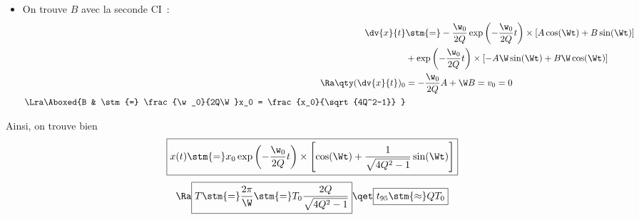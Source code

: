 \documentclass[a4paper, 10pt, final, garamond]{book}
\begin{document}
\begin{enumerate}[label=\sqenumi, leftmargin=10pt]
\begin{isd}[sidebyside align=top]
{\begin{itemize}
\begin{gather*}
					            x(0) = L_0 - \ell_0 =
					            1 \left[ A \cdot 1 + B \cdot 0 \right] = A
					            \quad \Ra \quad
					            \boxed{A \stm{=} x_0}
				            \end{gather*}
				      \item On trouve $B$ avec la seconde CI~:
				            \begin{align*}
					            \dv{x}{t}           & \stm{=}
					            -\frac{\w_0}{2Q}\exp \left( -\frac{\w_0}{2Q}t \right)
					            \times
					            \left[ A\cos(\Wt) + B\sin(\Wt) \right]
					            \\
					                                & +
					            \exp \left( -\frac{\w_0}{2Q}t \right)
					            \times
					            \left[ -A\W\sin(\Wt) + B\W\cos(\Wt) \right]
					            \\\Ra
					            \qty(\dv{x}{t})_{0} & =
					            - \frac{\w_0}{2Q}A + \W B = v_0 = 0
					            \\\Lra
					            \Aboxed{%
					            B                   & \stm{=}
						            \frac{\w_0}{2Q\W}x_0 = \frac{x_0}{\sqrt{4Q^2-1}}
					            }
				            \end{align*}
			      \end{itemize}
			      Ainsi, on trouve bien
			      \[
				      \boxed{
					      x(t) \stm{=} x_0\exp \left( -\frac{\w_0}{2Q}t \right)\times
					      \left[
						      \cos(\Wt) + \frac{1}{\sqrt{4Q^2 - 1}}\sin(\Wt)
						      \right]
				      }
			      \]
			      \begin{equation*}
				      \Ra
				      \boxed{
					      T \stm{=}
					      \frac{2\pi}{\W} \stm{=}
					      T_0 \frac{2Q}{\sqrt{4Q^{2} - 1}}
				      }
				      \qet
				      \boxed{t_{95} \stm{\approx} QT_0}
			      \end{equation*}
		      }
		      \begin{center}
\end{center}
\end{isd}
\end{enumerate}
\end{document}
